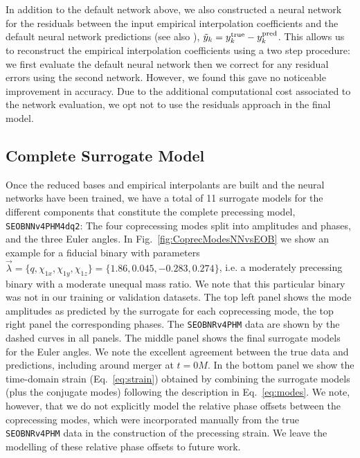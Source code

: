\documentclass[prd,amssymb,amsmath,amsfonts,superscriptaddress,nofootinbib,reprint,showpacs, longbibliography]{revtex4-1}
\newcommand{\SEOB}{\texttt{SEOBNRv4PHM}}
\newcommand{\SEOBNN}{\texttt{SEOBNN\textunderscore v4PHM\textunderscore4dq2}}
\begin{document}
In addition to the default network above, we also constructed a neural network for the residuals between the input empirical interpolation coefficients and the default neural network predictions (see also \cite{Fragkouli:2022lpt}), $\tilde{y}_k = y^{\rm true}_k - y^{\rm pred}_k$. This allows us to reconstruct the empirical interpolation coefficients using a two step procedure: we first evaluate the default neural network then we correct for any residual errors using the second network. However, we found this gave no noticeable improvement in accuracy. Due to the additional computational cost associated to the network evaluation, we opt not to use the residuals approach in the final model. 

\subsection{Complete Surrogate Model}
\label{subsec:CompleteSurrogateModel}
Once the reduced bases and empirical interpolants are built and the neural networks have been trained, we have a total of 11 surrogate models for the different components that constitute the complete precessing model, \SEOBNN: The four coprecessing modes split into amplitudes and phases, and the three Euler angles. 
In Fig.~\ref{fig:CoprecModesNNvsEOB} we show an example for a fiducial binary with parameters $\vec{\lambda} = \lbrace q,\chi_{1x},\chi_{1y},\chi_{1z} \rbrace = \lbrace 1.86, 0.045, -0.283, 0.274 \rbrace$, i.e. a moderately precessing binary with a moderate unequal mass ratio. We note that this particular binary was not in our training or validation datasets. The top left panel shows the mode amplitudes as predicted by the surrogate for each coprecessing mode, the top right panel the corresponding phases. The \SEOB{} data are shown by the dashed curves in all panels. The middle panel shows the final surrogate models for the Euler angles. We note the excellent agreement between the true data and predictions, including around merger at $t=0 M$. In the bottom panel we show the time-domain strain (Eq.~\eqref{eq:strain}) obtained by combining the surrogate models (plus the conjugate modes) following the description in Eq.~\eqref{eq:modes}.  
We note, however, that we do not explicitly model the relative phase offsets between the coprecessing modes, which were incorporated manually from the true \SEOB{} data in the construction of the precessing strain. We leave the modelling of these relative phase offsets to future work.
\end{document}
